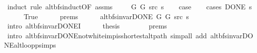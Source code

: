 \begin{isabellebody}
\ {\isacharparenleft}{\kern0pt}induct\ rule{\isacharcolon}{\kern0pt}\ alt{\isacharunderscore}{\kern0pt}bfs{\isacharunderscore}{\kern0pt}induct{\isacharbrackleft}{\kern0pt}OF\ assms{\isacharparenleft}{\kern0pt}{}{\isacharparenright}{\kern0pt}{\isacharbrackright}{\kern0pt}{\isacharparenright}{\kern0pt}\isanewline
\ \ \isamarkupfalse%
\ {\isacharparenleft}{\kern0pt}{}\ G{}\ G{}\ src\ s{\isacharparenright}{\kern0pt}\isanewline
\ \ \isamarkupfalse%
\ {\isacharquery}{\kern0pt}case\isanewline
\ \ \isamarkupfalse%
\ {\isacharparenleft}{\kern0pt}cases\ {\isachardoublequoteopen}DONE\ s{\isachardoublequoteclose}{\isacharparenright}{\kern0pt}\isanewline
\ \ \ \ \isamarkupfalse%
\ True\isanewline
\ \ \ \ \isamarkupfalse%
\ {\isachardoublequoteopen}{}{\isachardot}{\kern0pt}prems{\isachardoublequoteclose}{\isacharparenleft}{\kern0pt}{}{\isacharparenright}{\kern0pt}\isanewline
\ \ \ \ \isamarkupfalse%
\ {\isachardoublequoteopen}alt{\isacharunderscore}{\kern0pt}bfs{\isacharunderscore}{\kern0pt}invar{\isacharunderscore}{\kern0pt}DONE{\isacharprime}{\kern0pt}\ G{}\ G{}\ src\ s{\isachardoublequoteclose}\isanewline
\ \ \ \ \ \ \isamarkupfalse%
\ {\isacharparenleft}{\kern0pt}intro\ alt{\isacharunderscore}{\kern0pt}bfs{\isacharunderscore}{\kern0pt}invar{\isacharunderscore}{\kern0pt}DONE{\isacharprime}{\kern0pt}I{\isacharparenright}{\kern0pt}\isanewline
\ \ \ \ \isamarkupfalse%
\ {\isacharquery}{\kern0pt}thesis\isanewline
\ \ \ \ \ \ \isamarkupfalse%
\ {\isachardoublequoteopen}{}{\isachardot}{\kern0pt}prems{\isachardoublequoteclose}{\isacharparenleft}{\kern0pt}{}{\isacharparenright}{\kern0pt}\isanewline
\ \ \ \ \ \ \isamarkupfalse%
\ {\isacharparenleft}{\kern0pt}intro\ alt{\isacharunderscore}{\kern0pt}bfs{\isacharunderscore}{\kern0pt}invar{\isacharunderscore}{\kern0pt}DONE{\isachardot}{\kern0pt}not{\isacharunderscore}{\kern0pt}white{\isacharunderscore}{\kern0pt}imp{\isacharunderscore}{\kern0pt}is{\isacharunderscore}{\kern0pt}shortest{\isacharunderscore}{\kern0pt}alt{\isacharunderscore}{\kern0pt}path{\isacharparenright}{\kern0pt}\ {\isacharparenleft}{\kern0pt}simp{\isacharunderscore}{\kern0pt}all\ add{\isacharcolon}{\kern0pt}\ alt{\isacharunderscore}{\kern0pt}bfs{\isacharunderscore}{\kern0pt}invar{\isacharunderscore}{\kern0pt}DONE{\isachardot}{\kern0pt}alt{\isacharunderscore}{\kern0pt}loop{\isacharunderscore}{\kern0pt}psimps{\isacharparenright}{\kern0pt}\isanewline

\end{isabellebody}
